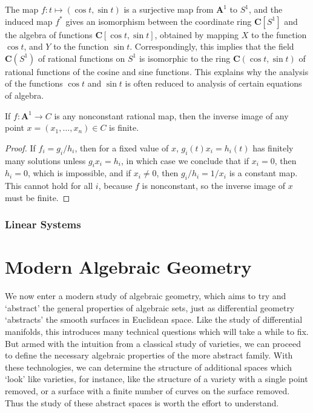 \begin{example}
    The map $f: t \mapsto (\cos t, \sin t)$ is a surjective map from $\mathbf{A}^1$ to $S^1$, and the induced map $f^*$ gives an isomorphism between the coordinate ring $\mathbf{C}[S^1]$ and the algebra of functions $\mathbf{C}[\cos t, \sin t]$, obtained by mapping $X$ to the function $\cos t$, and $Y$ to the function $\sin t$. Correspondingly, this implies that the field $\mathbf{C}(S^1)$ of rational functions on $S^1$ is isomorphic to the ring $\mathbf{C}(\cos t, \sin t)$ of rational functions of the cosine and sine functions. This explains why the analysis of the functions $\cos t$ and $\sin t$ is often reduced to analysis of certain equations of algebra.
\end{example}

\begin{theorem}
    If $f: \mathbf{A}^1 \to C$ is any nonconstant rational map, then the inverse image of any point $x = (x_1, \dots, x_n) \in C$ is finite.
\end{theorem}
\begin{proof}
    If $f_i = g_i/h_i$, then for a fixed value of $x$, $g_i(t)x_i = h_i(t)$ has finitely many solutions unless $g_ix_i = h_i$, in which case we conclude that if $x_i = 0$, then $h_i = 0$, which is impossible, and if $x_i \neq 0$, then $g_i/h_i = 1/x_i$ is a constant map. This cannot hold for all $i$, because $f$ is nonconstant, so the inverse image of $x$ must be finite.
\end{proof}

\section{Linear Systems}

\part{Modern Algebraic Geometry}

We now enter a modern study of algebraic geometry, which aims to try and `abstract' the general properties of algebraic sets, just as differential geometry `abstracts' the smooth surfaces in Euclidean space. Like the study of differential manifolds, this introduces many technical questions which will take a while to fix. But armed with the intuition from a classical study of varieties, we can proceed to define the necessary algebraic properties of the more abstract family. With these technologies, we can determine the structure of additional spaces which `look' like varieties, for instance, like the structure of a variety with a single point removed, or a surface with a finite number of curves on the surface removed. Thus the study of these abstract spaces is worth the effort to understand.

